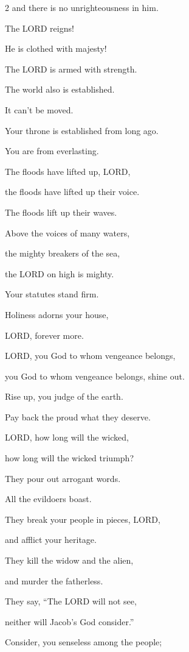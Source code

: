 \begin{multicols}{2}
	and there is no unrighteousness in him.
	
	
	\mychapter{} \myverse*{}The LORD reigns!
	
	\quad\quad He is clothed with majesty!
	
	The LORD is armed with strength.
	
	The world also is established.
	
	It can’t be moved.
	
	
	\myverse{}Your throne is established from long ago.
	
	You are from everlasting.
	
	
	\myverse{}The floods have lifted up, LORD,
	
	the floods have lifted up their voice.
	
	The floods lift up their waves.
	
	
	\myverse{}Above the voices of many waters,
	
	the mighty breakers of the sea,
	
	the LORD on high is mighty.
	
	
	\myverse{}Your statutes stand firm.
	
	Holiness adorns your house,
	
	LORD, forever more.
	
	
	\mychapter{} \myverse*{}LORD, you God to whom vengeance belongs,
	
	\quad\quad you God to whom vengeance belongs, shine out.
	
	
	\myverse{}Rise up, you judge of the earth.
	
	Pay back the proud what they deserve.
	
	
	\myverse{}LORD, how long will the wicked,
	
	how long will the wicked triumph?
	
	
	\myverse{}They pour out arrogant words.
	
	All the evildoers boast.
	
	
	\myverse{}They break your people in pieces, LORD,
	
	and afflict your heritage.
	
	
	\myverse{}They kill the widow and the alien,
	
	and murder the fatherless.
	
	
	\myverse{}They say, “The LORD will not see,
	
	neither will Jacob’s God consider.”
	
	
	\myverse{}Consider, you senseless among the people;
	

\end{multicols}
